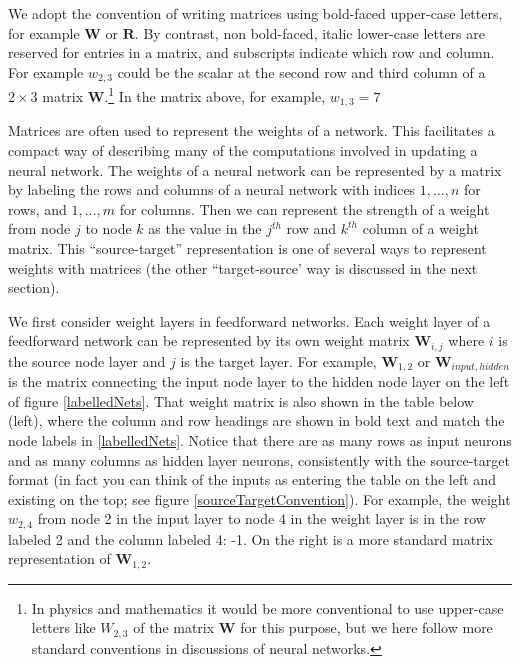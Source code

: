 We adopt the convention of writing matrices using bold-faced upper-case letters, for example $\mathbf{W}$ or $\mathbf{R}$. By contrast, non bold-faced, italic lower-case letters are reserved for entries in a matrix, and subscripts indicate which row and column. For example $w_{2,3}$ could be the scalar at the second row and third column of a $2 \times 3$ matrix $\mathbf{W}$.\footnote{In physics and mathematics it would be more conventional to use upper-case letters like $W_{2,3}$ of the matrix $\mathbf{W}$ for this purpose, but we here follow more standard conventions in discussions of neural networks.} In the matrix above, for example, $w_{1,3} = 7 $


Matrices are often used to represent the weights of a network. This facilitates a compact way of describing many of the computations involved in updating a neural network. The weights of a neural network can be represented by a matrix by labeling the rows and columns of a neural network with indices $1,\dots,n$ for rows, and $1,\dots,m$ for columns. Then we can represent the strength of a weight from node $j$ to node $k$ as the value in the $j^{th}$ row and $k^{th}$ column of a weight matrix. This ``source-target'' representation is one of several ways to represent weights with matrices (the other ``target-source' way is discussed in the next section).

We first consider weight layers in feedforward networks. Each weight layer of a feedforward network can be represented by its own weight matrix $\textbf{W}_{i,j}$ where $i$ is the source node layer and $j$ is the target layer. For example, $\textbf{W}_{1,2}$ or $\textbf{W}_{input,hidden}$ is the matrix connecting the input node layer to the hidden node layer on the left of figure \ref{labelledNets}. That weight matrix is also shown in the table below (left), where the column and row headings are shown in bold text and match the node labels in \ref{labelledNets}. Notice that there are as many rows as input neurons and as many columns as hidden layer neurons, consistently with the source-target format (in fact you can think of the inputs as entering the table on the left and existing on the top; see figure \ref{sourceTargetConvention}). For example, the weight $w_{2,4}$ from node 2 in the input layer to node 4 in the weight layer is in the row labeled 2 and the column labeled 4: -1. On the right is a more standard matrix representation of $\textbf{W}_{1,2}$.

